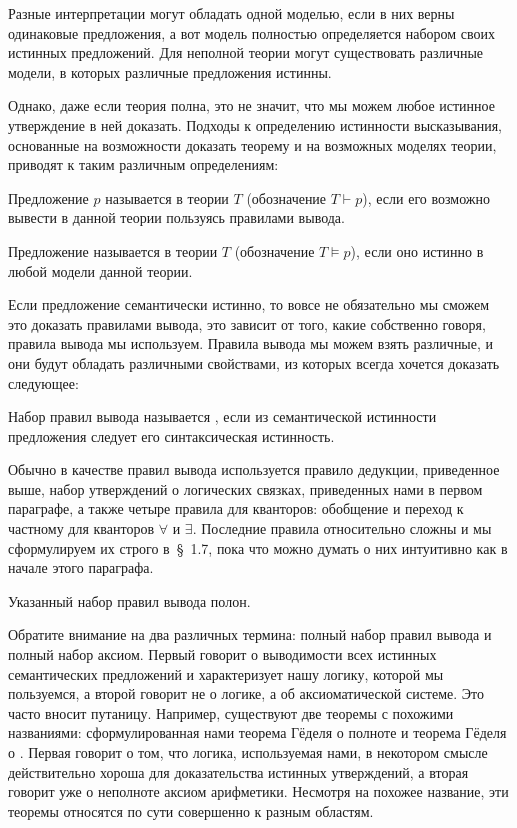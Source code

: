 Разные интерпретации могут обладать одной моделью, если в них верны одинаковые предложения, а вот модель полностью определяется набором своих истинных предложений. Для неполной теории могут существовать различные модели, в которых различные предложения истинны.

Однако, даже если теория полна, это не значит, что мы можем любое истинное утверждение в ней доказать. Подходы к определению истинности высказывания, основанные на возможности доказать теорему и на возможных моделях теории, приводят к таким различным определениям:

\begin{definition}
Предложение $p$ называется  в теории $T$ (обозначение $T\vdash p$), если его возможно вывести в данной теории пользуясь правилами вывода.
\end{definition}

\begin{definition}
Предложение называется  в теории $T$ (обозначение $T\models p$), если оно истинно в любой модели данной теории.
\end{definition}

Если предложение семантически истинно, то вовсе не обязательно мы сможем это доказать правилами вывода, это зависит от того, какие собственно говоря, правила вывода мы используем. Правила вывода мы можем взять различные, и они будут обладать различными свойствами, из которых всегда хочется доказать следующее:

\begin{definition}
Набор правил вывода называется , если из семантической истинности предложения следует его синтаксическая истинность.
\end{definition}

Обычно в качестве правил вывода используется правило дедукции, приведенное выше, набор утверждений о логических связках, приведенных нами в первом параграфе, а также четыре правила для кванторов: обобщение и переход к частному для кванторов $\forall$ и $\exists$. Последние правила относительно сложны и мы сформулируем их строго в~\S~1.7, пока что можно думать о них интуитивно как в начале этого параграфа.

\begin{GodelsCompleteness}
Указанный набор правил вывода полон.
\end{GodelsCompleteness}

Обратите внимание на два различных термина: полный набор правил вывода и полный набор аксиом. Первый говорит о выводимости всех истинных семантических предложений  и характеризует нашу логику, которой мы пользуемся, а второй говорит не о логике, а об аксиоматической системе. Это часто вносит путаницу. Например, существуют две теоремы с похожими названиями: сформулированная нами теорема Гёделя о полноте и теорема Гёделя о . Первая говорит о том, что логика, используемая нами, в некотором смысле действительно хороша для доказательства истинных утверждений, а вторая говорит уже о неполноте аксиом арифметики. Несмотря на похожее название, эти теоремы относятся по сути совершенно к разным областям.

